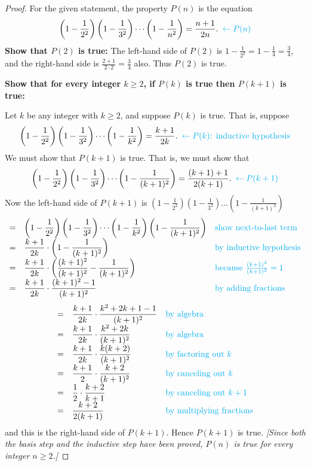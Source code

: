 \documentclass[14pt]{extarticle}
\newcommand{\dps}{\displaystyle}
\newcommand{\from}{\leftarrow}
\newcommand{\cy}{\color{cyan}}
\begin{document}
\begin{proof}
For the given statement, the property $P(n)$ is the equation
\[
\dps \left(1 - \frac{1}{2^2}\right)\left(1 - \frac{1}{3^2}\right) \cdots \left(1 - \frac{1}{n^2}\right) = \frac{n+1}{2n}. \,\,\, {\cy \from P(n)}
\]
{\bf Show that $P(2)$ is true:} The left-hand side of $P(2)$ is $\dps 1 - \frac{1}{2^2} = 1 - \frac{1}{4} = \frac{3}{4}$, and the right-hand side is $\dps \frac{2+1}{2 \cdot 2} = \frac{3}{4}$ also. Thus $P(2)$ is true.

{\bf Show that for every integer $k \geq 2$, if $P(k)$ is true then $P(k + 1)$ is true:}

Let $k$ be any integer with $k \geq 2$, and suppose $P(k)$ is true. That is, suppose
\[
\dps \left(1 - \frac{1}{2^2}\right)\left(1 - \frac{1}{3^2}\right) \cdots \left(1 - \frac{1}{k^2}\right) = \frac{k+1}{2k}. \,\,\, {\cy \from P(k) \text{: inductive hypothesis}}
\]
We must show that $P(k + 1)$ is true. That is, we must show that
\[
\dps \left(1 - \frac{1}{2^2}\right)\left(1 - \frac{1}{3^2}\right) \cdots \left(1 - \frac{1}{(k+1)^2}\right) = \frac{(k+1)+1}{2(k+1)}. \,\,\,{\cy \from P(k+1)}
\]
Now the left-hand side of $P(k + 1)$ is $\dps \left(1 - \frac{1}{2^2}\right)\left(1 - \frac{1}{3^2}\right) \ldots \left(1 - \frac{1}{(k+1)^2}\right)$
\[
\begin{array}{lll}
= & \dps \left(1 - \frac{1}{2^2}\right)\left(1 - \frac{1}{3^2}\right) \cdots \left(1 - \frac{1}{k^2}\right) \left(1 - \frac{1}{(k+1)^2}\right) & \text{\cy show next-to-last term} \\
= & \dps \frac{k+1}{2k} \cdot \left(1 - \frac{1}{(k+1)^2}\right) & \text{\cy by inductive hypothesis} \\
= & \dps \frac{k+1}{2k} \cdot \left(\frac{(k+1)^2}{(k+1)^2} - \frac{1}{(k+1)^2}\right) & \text{\cy because $\frac{(k+1)^2}{(k+1)^2} = 1$} \\
= & \dps \frac{k+1}{2k} \cdot \frac{(k+1)^2 - 1}{(k+1)^2} & \text{\cy by adding fractions}
\end{array}
\]
\[
\begin{array}{lll}
= & \dps \frac{k+1}{2k} \cdot \frac{k^2+2k+1 - 1}{(k+1)^2} & \text{\cy by algebra} \\
= & \dps \frac{k+1}{2k} \cdot \frac{k^2+2k}{(k+1)^2} & \text{\cy by algebra} \\
= & \dps \frac{k+1}{2k} \cdot \frac{k(k+2)}{(k+1)^2} & \text{\cy by factoring out $k$} \\
= & \dps \frac{k+1}{2} \cdot \frac{k+2}{(k+1)^2} & \text{\cy by canceling out $k$} \\
= & \dps \frac{1}{2} \cdot \frac{k+2}{k+1} & \text{\cy by canceling out $k+1$} \\
= & \dps \frac{k+2}{2(k+1)} & \text{\cy by multiplying fractions} 
\end{array}
\]
and this is the right-hand side of $P(k + 1)$. Hence $P(k + 1)$ is true. {\it [Since both the basis step and the inductive step have been proved, $P(n)$ is true for every integer $n \geq 2$.]}
\end{proof}
\end{document}
